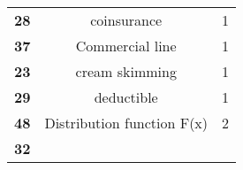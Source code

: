 \documentclass[]{book}
\theoremstyle{definition}
\theoremstyle{definition}
\theoremstyle{definition}
\theoremstyle{remark}
\begin{document}
\begin{longtable}[]{@{}ccc@{}}
\begin{minipage}[t]{0.11\columnwidth}
\textbf{28}\strut
\end{minipage} & \begin{minipage}[t]{0.42\columnwidth}\centering\strut
coinsurance\strut
\end{minipage} & \begin{minipage}[t]{0.29\columnwidth}\centering\strut
1\strut
\end{minipage}\tabularnewline
\begin{minipage}[t]{0.11\columnwidth}\centering\strut
\textbf{37}\strut
\end{minipage} & \begin{minipage}[t]{0.42\columnwidth}\centering\strut
Commercial line\strut
\end{minipage} & \begin{minipage}[t]{0.29\columnwidth}\centering\strut
1\strut
\end{minipage}\tabularnewline
\begin{minipage}[t]{0.11\columnwidth}\centering\strut
\textbf{23}\strut
\end{minipage} & \begin{minipage}[t]{0.42\columnwidth}\centering\strut
cream skimming\strut
\end{minipage} & \begin{minipage}[t]{0.29\columnwidth}\centering\strut
1\strut
\end{minipage}\tabularnewline
\begin{minipage}[t]{0.11\columnwidth}\centering\strut
\textbf{29}\strut
\end{minipage} & \begin{minipage}[t]{0.42\columnwidth}\centering\strut
deductible\strut
\end{minipage} & \begin{minipage}[t]{0.29\columnwidth}\centering\strut
1\strut
\end{minipage}\tabularnewline
\begin{minipage}[t]{0.11\columnwidth}\centering\strut
\textbf{48}\strut
\end{minipage} & \begin{minipage}[t]{0.42\columnwidth}\centering\strut
Distribution function F(x)\strut
\end{minipage} & \begin{minipage}[t]{0.29\columnwidth}\centering\strut
2\strut
\end{minipage}\tabularnewline
\begin{minipage}[t]{0.11\columnwidth}\centering\strut
\textbf{32}\strut
\end{minipage} & \begin{minipage}[t]{0.42\columnwidth}\centering\strut

\end{minipage}
\end{longtable}
\end{document}
